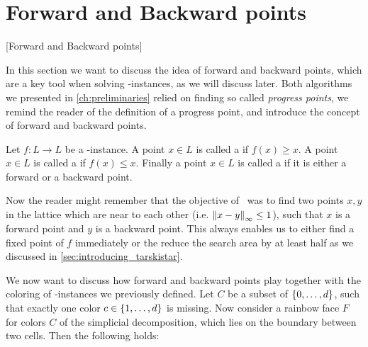 \section{Forward and Backward points}[Forward and Backward points]

In this section we want to discuss the idea of forward and backward points, which are a key tool when solving \Tarski-instances, as we will discuss later. Both algorithms we presented in \cref{ch:preliminaries} relied on finding so called \emph{progress points}, we remind the reader of the definition of a progress point, and introduce the concept of forward and backward points.

\begin{definition}
	Let $f: L \rightarrow L$ be a \Tarski-instance. A point $x \in L$ is called a  if $f(x) \geq x$. A point $x \in L$ is called a  if $f(x) \leq x$. Finally a point $x \in L$ is called a  if it is either a forward or a backward point.
\end{definition}

Now the reader might remember that the objective of \Tarskistar\ was to find two points $x, y$ in the lattice which are near to each other (i.e. $\left\lVert x-y\right\rVert_{\infty}\leq 1$), such that $x$ is a forward point and $y$ is a backward point. This always enables us to either find a fixed point of $f$ immediately or the reduce the search area by at least half as we discussed in \cref{sec:introducing_tarskistar}.

We now want to discuss how forward and backward points play together with the coloring of \Tarski-instances we previously defined. Let $C$ be a subset of $\left\{0, \dots, d\right\}$, such that exactly one color $c \in \left\{1, \dots, d\right\}$ is missing. Now consider a rainbow face $F$ for colors $C$ of the simplicial decomposition, which lies on the boundary between two cells. Then the following holds:


